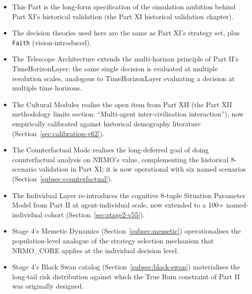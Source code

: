 \begin{itemize}
\item This Part is the long-form specification of the simulation
ambition behind Part XI's
historical validation (the Part XI historical validation chapter).

\item The decision theories used here are the same as Part XI's strategy
set, plus \texttt{Faith} (vision-introduced).

\item The Telescope Architecture extends the multi-horizon principle of
Part II's TimeHorizonLayer: the
same single decision is evaluated at multiple resolution scales,
analogous to TimeHorizonLayer evaluating a decision at multiple time
horizons.

\item The Cultural Modules realise the open item from Part XII
(the Part XII methodology limits section: ``Multi-agent
inter-civilisation interaction''), now empirically calibrated against
historical demography literature
(Section~\ref{sec:calibration-v62}).

\item The Counterfactual Mode realises the long-deferred goal of doing
counterfactual analysis on NRMO's value, complementing the historical
8-scenario validation in Part XI; it is now operational with six
named scenarios (Section~\ref{subsec:counterfactual}).

\item The Individual Layer re-introduces the cognitive 8-tuple
Situation Parameter Model from Part II at agent-individual scale,
now extended to a 100+ named-individual cohort
(Section~\ref{sec:stage2-v55}).

\item Stage 4's Memetic Dynamics (Section~\ref{subsec:memetic})
operationalises the population-level analogue of the strategy
selection mechanism that NRMO\_CORE applies at the individual
decision level.

\item Stage 4's Black Swan catalog (Section~\ref{subsec:black-swan})
materialises the long-tail risk distribution against which the True
Ruin constraint of Part II was originally designed.
\end{itemize}
